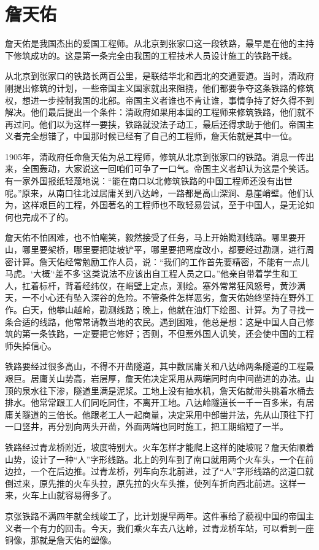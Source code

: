 \documentclass[12pt,UTF-8,openany]{ctexbook}
\begin{document}
\chapter{詹天佑}

\begin{large}
    
    詹天佑是我国杰出的爱国工程师。从北京到张家口这一段铁路，最早是在他的主持下修筑成功的。这是第一条完全由我国的工程技术人员设计施工的铁路干线。
    
    从北京到张家口的铁路长两百公里，是联结华北和西北的交通要道。当时，清政府刚提出修筑的计划，一些帝国主义国家就出来阻挠，他们都要争夺这条铁路的修筑权，想进一步控制我国的北部。帝国主义者谁也不肯让谁，事情争持了好久得不到解决。他们最后提出一个条件：清政府如果用本国的工程师来修筑铁路，他们就不再过问。他们以为这样一要挟，铁路就没法子动工，最后还得求助于他们。帝国主义者完全想错了，中国那时候已经有了自己的工程师，詹天佑就是其中一位。
    
    1905年，清政府任命詹天佑为总工程师，修筑从北京到张家口的铁路。消息一传出来，全国轰动，大家说这一回咱们可争了一口气。帝国主义者却认为这是个笑话。有一家外国报纸轻蔑地说：“能在南口以北修筑铁路的中国工程师还没有出世呢。”原来，从南口往北过居庸关到八达岭，一路都是高山深涧、悬崖峭壁。他们认为，这样艰巨的工程，外国著名的工程师也不敢轻易尝试，至于中国人，是无论如何也完成不了的。
    
    詹天佑不怕困难，也不怕嘲笑，毅然接受了任务，马上开始勘测线路。哪里要开山，哪里要架桥，哪里要把陡坡铲平，哪里要把弯度改小，都要经过勘测，进行周密计算。詹天佑经常勉励工作人员，说：“我们的工作首先要精密，不能有一点儿马虎。‘大概’‘差不多’这类说法不应该出自工程人员之口。”他亲自带着学生和工人，扛着标杆，背着经纬仪，在峭壁上定点，测绘。塞外常常狂风怒号，黄沙满天，一不小心还有坠入深谷的危险。不管条件怎样恶劣，詹天佑始终坚持在野外工作。白天，他攀山越岭，勘测线路；晚上，他就在油灯下绘图、计算。为了寻找一条合适的线路，他常常请教当地的农民。遇到困难，他总是想：这是中国人自己修筑的第一条铁路，一定要把它修好；否则，不但惹外国人讥笑，还会使中国的工程师失掉信心。
    
    铁路要经过很多高山，不得不开凿隧道，其中数居庸关和八达岭两条隧道的工程最艰巨。居庸关山势高，岩层厚，詹天佑决定采用从两端同时向中间凿进的办法。山顶的泉水往下渗，隧道里满是泥浆。工地上没有抽水机，詹天佑就带头挑着水桶去排水。他常常跟工人们同吃同住，不离开工地。八达岭隧道长一千一百多米，有居庸关隧道的三倍长。他跟老工人一起商量，决定采用中部凿井法，先从山顶往下打一口竖井，再分别向两头开凿，外面两端也同时施工，把工期缩短了一半。
    
    铁路经过青龙桥附近，坡度特别大。火车怎样才能爬上这样的陡坡呢？詹天佑顺着山势，设计了一种“人”字形线路。北上的列车到了南口就用两个火车头，一个在前边拉，一个在后边推。过青龙桥，列车向东北前进，过了“人”字形线路的岔道口就倒过来，原先推的火车头拉，原先拉的火车头推，使列车折向西北前进。这样一来，火车上山就容易得多了。
    
    京张铁路不满四年就全线竣工了，比计划提早两年。这件事给了藐视中国的帝国主义者一个有力的回击。今天，我们乘火车去八达岭，过青龙桥车站，可以看到一座铜像，那就是詹天佑的塑像。
    
\end{large}
\end{document}
